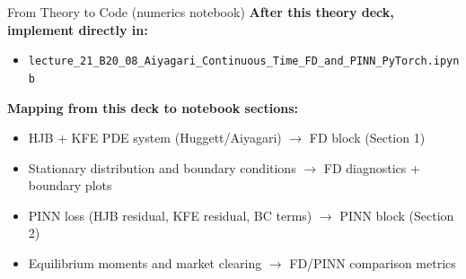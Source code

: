\documentclass[aspectratio=169,11pt]{beamer}
\begin{document}
\begin{frame}{From Theory to Code (numerics notebook)}
\footnotesize
\textbf{After this theory deck, implement directly in:}
\begin{itemize}\itemsep2pt
    \item \texttt{lecture\_21\_B20\_08\_Aiyagari\_Continuous\_Time\_FD\_and\_PINN\_PyTorch.ipynb}
\end{itemize}

\vspace{0.2em}
\textbf{Mapping from this deck to notebook sections:}
\begin{itemize}\itemsep2pt
    \item HJB + KFE PDE system (Huggett/Aiyagari) $\rightarrow$ FD block (Section 1)
    \item Stationary distribution and boundary conditions $\rightarrow$ FD diagnostics + boundary plots
    \item PINN loss (HJB residual, KFE residual, BC terms) $\rightarrow$ PINN block (Section 2)
    \item Equilibrium moments and market clearing $\rightarrow$ FD/PINN comparison metrics
\end{itemize}
\end{frame}
\end{document}
